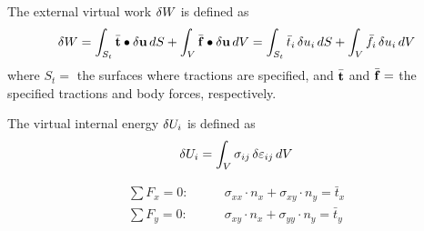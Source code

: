 The external virtual work $\delta W$ is defined as
\begin{equation}
  \delta W = \int_{S_t}\bar{\mathbf{t}}\bullet\delta\mathbf{u}\,dS + \int_V\bar{\mathbf{f}}\bullet\delta\mathbf{u}\,dV
      = \int_{S_t}\bar t_i\,\delta u_i\,dS + \int_V\bar f_i\,\delta u_i\,dV
\end{equation}
where $S_t =$ the surfaces where tractions are specified, and $\bar{\mathbf{t}}$ and $\bar{\mathbf{f}} =$ the specified tractions and body forces, respectively.

The virtual internal energy $\delta U_i$ is defined as
\begin{equation}
  \delta U_i = \int_V\sigma_{ij}\,\delta\varepsilon_{ij}\,dV
\end{equation}
\begin{fig}
  
\end{fig}
\begin{align*}
  \textstyle\sum F_x = 0:&\qquad \sigma_{xx}\cdot n_x + \sigma_{xy}\cdot n_y = \bar t_x\\
  \textstyle\sum F_y = 0:&\qquad \sigma_{xy}\cdot n_x + \sigma_{yy}\cdot n_y = \bar t_y
\end{align*}

